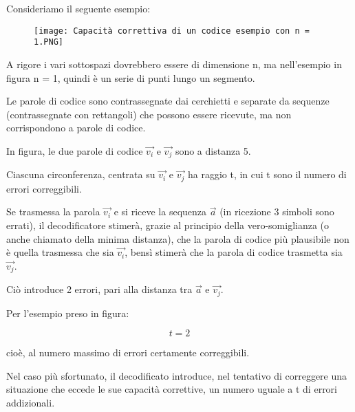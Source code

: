 Consideriamo il seguente esempio: 

\begin{figure}[h]
    \centering
    \texttt{[image: Capacità correttiva di un codice esempio con n = 1.PNG]}
\end{figure}

A rigore i vari sottospazi dovrebbero essere di dimensione n, 
ma nell'esempio in figura n = 1, quindi è un serie di punti lungo un segmento. \newline 

Le parole di codice sono contrassegnate dai cerchietti e separate da sequenze (contrassegnate con rettangoli) 
che possono essere ricevute, 
ma non corrispondono a parole di codice. \newline 

In figura, le due parole di codice $\overrightarrow{v_i}$ e $\overrightarrow{v_j}$ sono a distanza 5. \newline 

Ciascuna circonferenza, centrata su $\overrightarrow{v_i}$ e $\overrightarrow{v_j}$ ha raggio t, 
in cui t sono il numero di errori correggibili. \newline 

Se trasmessa la parola $\overrightarrow{v_i}$ e si riceve la sequenza $\overrightarrow{a}$ (in ricezione 3 simboli sono errati), 
il decodificatore stimerà, grazie al principio della vero-somiglianza (o anche chiamato della minima distanza), 
che la parola di codice più plausibile non è quella trasmessa che sia $\overrightarrow{v_i}$, 
bensì stimerà che la parola di codice trasmetta sia $\overrightarrow{v_j}$. \newline 

Ciò introduce 2 errori, pari alla distanza tra $\overrightarrow{a}$ e $\overrightarrow{v_j}$. \newline 

Per l'esempio preso in figura:

{
    \Large 
    \begin{equation}
        t = 2
    \end{equation}
}

cioè, al numero massimo di errori certamente correggibili. \newline 

Nel caso più sfortunato, il decodificato introduce, nel tentativo di correggere una situazione che eccede le sue capacità correttive, 
un numero uguale a t di errori addizionali. \newline 

